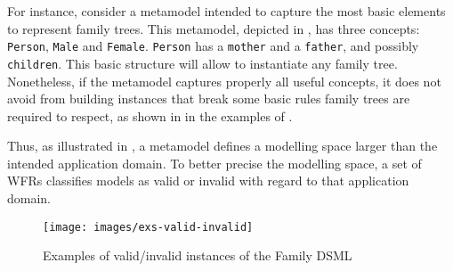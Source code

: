 For instance, consider a metamodel intended to capture the most basic elements to represent family trees. This metamodel, depicted in , has three concepts: \texttt{Person}, \texttt{Male} and \texttt{Female}. \texttt{Person} has a \texttt{mother} and a \texttt{father}, and possibly \texttt{children}. This basic structure will allow to instantiate any family tree. Nonetheless, if the metamodel captures properly all useful concepts, it does not avoid from building instances that break some basic rules family trees are required to respect, as shown in in the examples of . 

Thus, as illustrated in , a metamodel defines a modelling space larger than the intended application domain. To better precise the modelling space, a set of WFRs classifies models as valid or invalid with regard to that application domain.


\begin{figure}[h]
	\centering
	\texttt{[image: images/exs-valid-invalid]}
	\caption{Examples of valid/invalid instances of the Family DSML}
	\label{fig:exs-valid-ivalid}
\end{figure}

